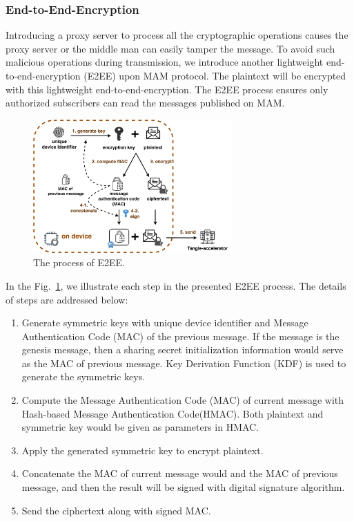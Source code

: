 \documentclass[conference]{IEEEtran}
\begin{document}
\subsubsection{End-to-End-Encryption}
Introducing a proxy server to process all the cryptographic operations causes the proxy server or the middle man can easily tamper the message. To avoid such malicious operations during transmission, we introduce another lightweight end-to-end-encryption (E2EE) upon MAM protocol. The plaintext will be encrypted with this lightweight end-to-end-encryption. The E2EE process ensures only authorized subscribers can read the messages published on MAM.

\begin{figure}[!h]
    \centering
    \includegraphics[width=3in]{MAM_E2EE_fold}
    \caption{The process of E2EE.}
    \label{fig:MAM_E2EE}
\end{figure}

In the Fig.~\ref{fig:MAM_E2EE}, we illustrate each step in the presented E2EE process. The details of steps are addressed below:

\begin{enumerate}
    \item Generate symmetric keys with unique device identifier and Message Authentication Code (MAC) of the previous message. If the message is the genesis message, then a sharing secret initialization information would serve as the MAC of previous message. Key Derivation Function (KDF) is used to generate the symmetric keys.
    \item Compute the Message Authentication Code (MAC) of current message with Hash-based Message Authentication Code(HMAC). Both plaintext and symmetric key would be given as parameters in HMAC.
    \item Apply the generated symmetric key to encrypt plaintext.
    \item Concatenate the MAC of current message would and the MAC of previous message, and then the result will be signed with digital signature algorithm.
    \item Send the ciphertext along with signed MAC.
\end{enumerate}
\end{document}
